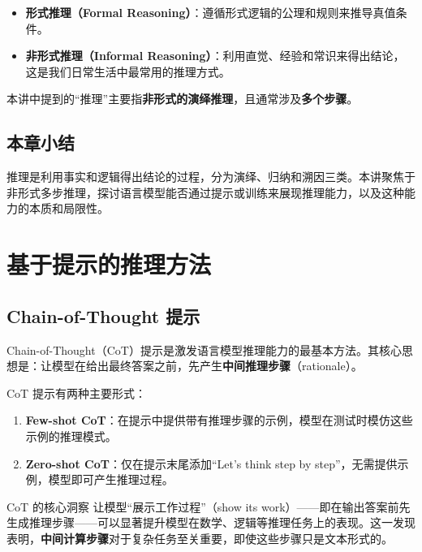 \documentclass[a4paper]{article}
\begin{document}



\begin{itemize}
    \item \textbf{形式推理（Formal Reasoning）}：遵循形式逻辑的公理和规则来推导真值条件。
    \item \textbf{非形式推理（Informal Reasoning）}：利用直觉、经验和常识来得出结论，这是我们日常生活中最常用的推理方式。
\end{itemize}

本讲中提到的``推理''主要指\textbf{非形式的演绎推理}，且通常涉及\textbf{多个步骤}。

\subsection{本章小结}

推理是利用事实和逻辑得出结论的过程，分为演绎、归纳和溯因三类。本讲聚焦于非形式多步推理，探讨语言模型能否通过提示或训练来展现推理能力，以及这种能力的本质和局限性。


\section{基于提示的推理方法}

\subsection{Chain-of-Thought 提示}

Chain-of-Thought（CoT）提示是激发语言模型推理能力的最基本方法。其核心思想是：让模型在给出最终答案之前，先产生\textbf{中间推理步骤}（rationale）。

CoT 提示有两种主要形式：

\begin{enumerate}
    \item \textbf{Few-shot CoT}：在提示中提供带有推理步骤的示例，模型在测试时模仿这些示例的推理模式。
    \item \textbf{Zero-shot CoT}：仅在提示末尾添加``Let's think step by step''，无需提供示例，模型即可产生推理过程。
\end{enumerate}




\begin{importantbox}{CoT 的核心洞察}
让模型``展示工作过程''（show its work）——即在输出答案前先生成推理步骤——可以显著提升模型在数学、逻辑等推理任务上的表现。这一发现表明，\textbf{中间计算步骤}对于复杂任务至关重要，即使这些步骤只是文本形式的。
\end{importantbox}
\end{document}
